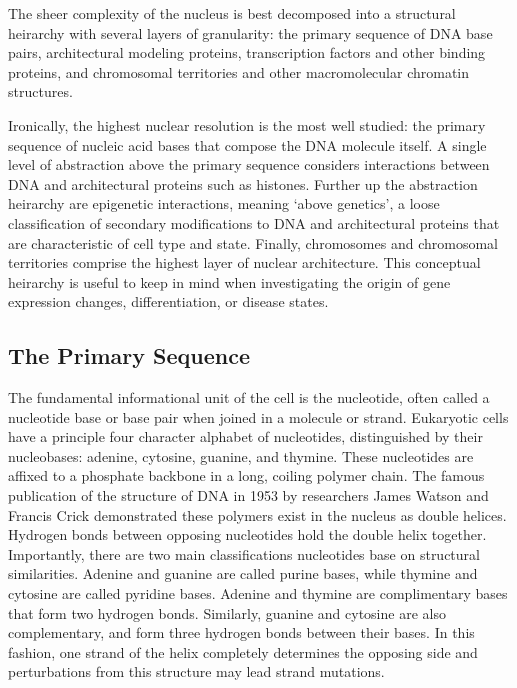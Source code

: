 The sheer complexity of the nucleus is best decomposed into a structural heirarchy with several layers of granularity: the primary
sequence of \gls{DNA} base pairs, architectural modeling proteins, transcription factors and other binding proteins, and \gls{chromosomal
  territories} and other macromolecular chromatin structures.

Ironically, the highest nuclear resolution is the most well studied: the primary sequence of nucleic acid bases that compose the \gls{DNA}
molecule itself.  A single level of abstraction above the primary sequence considers interactions between \gls{DNA} and  architectural
proteins such as histones.  Further up the abstraction heirarchy are \gls{epigenetic} interactions, meaning `above genetics'\cite{dictepi2014},
a loose classification of secondary modifications to \gls{DNA} and architectural proteins that are characteristic of cell type and state.
Finally, chromosomes and chromosomal territories comprise the highest layer of nuclear architecture.  This conceptual heirarchy is useful
to keep in mind when investigating the origin of gene expression changes, differentiation, or disease states.

\subsection*{The Primary Sequence}

The fundamental informational unit of the cell is the \gls{nucleotide}, often called a nucleotide base or base pair when joined in a
molecule or strand.  Eukaryotic cells have a principle four character alphabet of nucleotides, distinguished by their \gls{nucleobases}:
adenine, cytosine, guanine, and thymine.  These nucleotides are affixed to a phosphate backbone in a long, coiling polymer chain.  The
famous publication of the structure of \gls{DNA} in 1953 by researchers James Watson and Francis Crick demonstrated these polymers
exist in the nucleus as double helices\cite{watson1953}.  Hydrogen bonds between opposing nucleotides hold the double helix together.
Importantly, there are two main classifications nucleotides base on structural similarities.  Adenine and guanine are called purine bases,
while thymine and cytosine are called pyridine bases.  Adenine and thymine are complimentary bases that form two hydrogen bonds.  Similarly,
guanine and cytosine are also complementary, and form three hydrogen bonds between their bases.  In this fashion, one strand of the helix completely
determines the opposing side and perturbations from this structure may lead strand mutations\cite{cox2008}.

